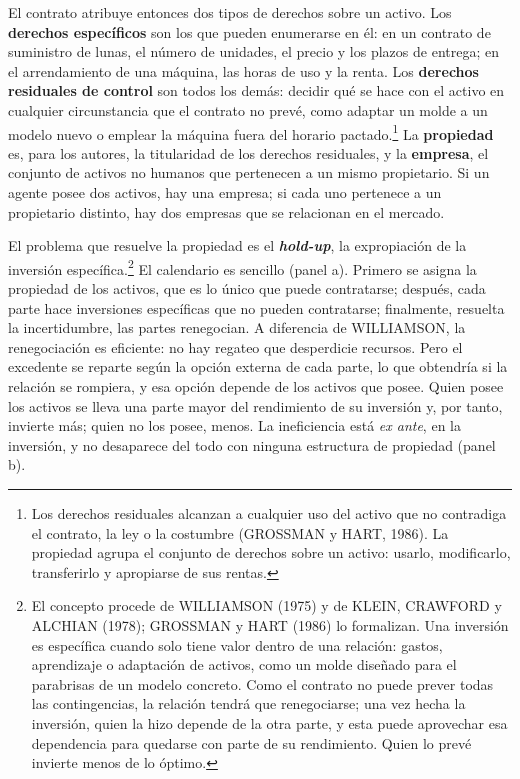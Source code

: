 \documentclass[10pt,a4paper]{article}
\begin{document}
El contrato atribuye entonces dos tipos de derechos sobre un activo. Los \textbf{derechos específicos} son los que pueden enumerarse en él: en un contrato de suministro de lunas, el número de unidades, el precio y los plazos de entrega; en el arrendamiento de una máquina, las horas de uso y la renta. Los \textbf{derechos residuales de control} son todos los demás: decidir qué se hace con el activo en cualquier circunstancia que el contrato no prevé, como adaptar un molde a un modelo nuevo o emplear la máquina fuera del horario pactado.\footnote{%
    Los derechos residuales alcanzan a cualquier uso del activo que no contradiga el contrato, la ley o la costumbre (GROSSMAN y HART, 1986). La propiedad agrupa el conjunto de derechos sobre un activo: usarlo, modificarlo, transferirlo y apropiarse de sus rentas.
} La \textbf{propiedad} es, para los autores, la titularidad de los derechos residuales, y la \textbf{empresa}, el conjunto de activos no humanos que pertenecen a un mismo propietario. Si un agente posee dos activos, hay una empresa; si cada uno pertenece a un propietario distinto, hay dos empresas que se relacionan en el mercado.

El problema que resuelve la propiedad es el \textbf{\textit{hold-up}}, la expropiación de la inversión específica.\footnote{%
    El concepto procede de WILLIAMSON (1975) y de KLEIN, CRAWFORD y ALCHIAN (1978); GROSSMAN y HART (1986) lo formalizan. Una inversión es específica cuando solo tiene valor dentro de una relación: gastos, aprendizaje o adaptación de activos, como un molde diseñado para el parabrisas de un modelo concreto. Como el contrato no puede prever todas las contingencias, la relación tendrá que renegociarse; una vez hecha la inversión, quien la hizo depende de la otra parte, y esta puede aprovechar esa dependencia para quedarse con parte de su rendimiento. Quien lo prevé invierte menos de lo óptimo.
} El calendario es sencillo (panel a). Primero se asigna la propiedad de los activos, que es lo único que puede contratarse; después, cada parte hace inversiones específicas que no pueden contratarse; finalmente, resuelta la incertidumbre, las partes renegocian. A diferencia de WILLIAMSON, la renegociación es eficiente: no hay regateo que desperdicie recursos. Pero el excedente se reparte según la opción externa de cada parte, lo que obtendría si la relación se rompiera, y esa opción depende de los activos que posee. Quien posee los activos se lleva una parte mayor del rendimiento de su inversión y, por tanto, invierte más; quien no los posee, menos. La ineficiencia está \textit{ex ante}, en la inversión, y no desaparece del todo con ninguna estructura de propiedad (panel b).
\end{document}
